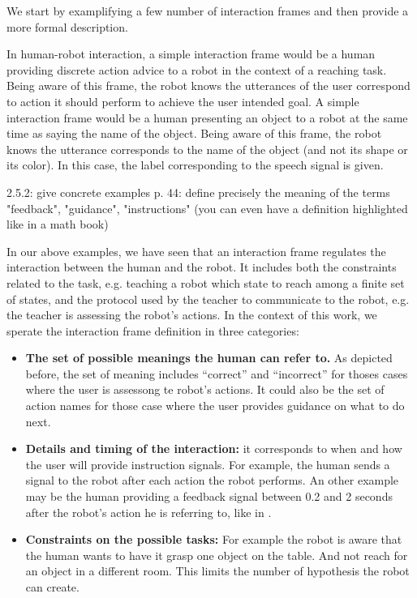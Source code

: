 We start by examplifying a few number of interaction frames and then provide a more formal description.

In human-robot interaction, a simple interaction frame would be a human providing discrete action advice to a robot in the context of a reaching task. Being aware of this frame, the robot knows the utterances of the user correspond to action it should perform to achieve the user intended goal. A simple interaction frame would be a human presenting an object to a robot at the same time as saying the name of the object. Being aware of this frame, the robot knows the utterance corresponds to the name of the object (and not its shape or its color). In this case, the label corresponding to the speech signal is given.

2.5.2: give concrete examples
p. 44: define precisely the meaning of the terms "feedback", "guidance", "instructions" (you can even have a definition highlighted like in a math book)



In our above examples, we have seen that an interaction frame regulates the interaction between the human and the robot. It includes both the constraints related to the task, e.g. teaching a robot which state to reach among a finite set of states, and the protocol used by the teacher to communicate to the robot, e.g. the teacher is assessing the robot's actions. In the context of this work, we sperate the interaction frame definition in three categories:

\begin{itemize}

\item \textbf{The set of possible meanings the human can refer to.} As depicted before, the set of meaning includes ``correct'' and ``incorrect'' for thoses cases where the user is assessong te robot's actions. It could also be the set of action names for those case where the user provides guidance on what to do next.

\item \textbf{Details and timing of the interaction:} it corresponds to when and how the user will provide instruction signals. For example, the human sends a signal to the robot after each action the robot performs. An other example may be the human providing a feedback signal between 0.2 and 2 seconds after the robot's action he is referring to, like in \cite{knox2009interactively}.

\item \textbf{Constraints on the possible tasks:} For example the robot is aware that the human wants to have it grasp one object on the table. And not reach for an object in a different room. This limits the number of hypothesis the robot can create.

\end{itemize}

